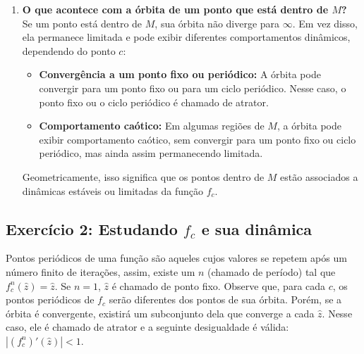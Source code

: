 \begin{enumerate}[label=(\alph*)]
    \item \textbf{O que acontece com a órbita de um ponto que está dentro de \( M \)?} \\

        Se um ponto está dentro de \( M \), sua órbita não diverge para \( \infty \). Em vez disso, ela permanece limitada e pode exibir diferentes comportamentos dinâmicos, dependendo do ponto \( c \):

        \begin{itemize}
            \item \textbf{Convergência a um ponto fixo ou periódico:} A órbita pode convergir para um ponto fixo ou para um ciclo periódico. Nesse caso, o ponto fixo ou o ciclo periódico é chamado de atrator.
            \item \textbf{Comportamento caótico:} Em algumas regiões de \( M \), a órbita pode exibir comportamento caótico, sem convergir para um ponto fixo ou ciclo periódico, mas ainda assim permanecendo limitada.
        \end{itemize}

        Geometricamente, isso significa que os pontos dentro de \( M \) estão associados a dinâmicas estáveis ou limitadas da função \( f_c \).

\end{enumerate}

\subsection{Exercício 2: Estudando \( f_c \) e sua dinâmica}

Pontos periódicos de uma função são aqueles cujos valores se repetem após um número finito de iterações, assim, existe um \( n \) (chamado de período) tal que \( f_c^n (\hat{z}) = \hat{z} \). Se \( n = 1 \), \( \hat{z} \) é chamado de ponto fixo. Observe que, para cada \( c \), os pontos periódicos de \( f_c \) serão diferentes dos pontos de sua órbita. Porém, se a órbita é convergente, existirá um subconjunto dela que converge a cada \( \hat{z} \). Nesse caso, ele é chamado de atrator e a seguinte desigualdade é válida: \( |(f_c^n)' (\hat{z})| < 1 \).

